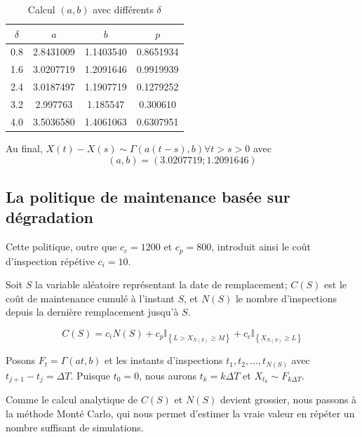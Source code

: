 \documentclass[10pt,a4paper]{article}
\begin{document}
\begin{table}[!h]
    \centering
    \begin{tabular}{|c|c|c|c|}
        \hline
        $\delta$ & $a$ & $b$ & $p$ \\
        \hline
        0.8 & 2.8431009 & 1.1403540 & 0.8651934\\
        1.6 & 3.0207719 & 1.2091646 & 0.9919939\\
        2.4 & 3.0187497 & 1.1907719 & 0.1279252\\
        3.2 & 2.997763 & 1.185547 & 0.300610\\
        4.0 & 3.5036580 & 1.4061063 & 0.6307951\\
        \hline
    \end{tabular}
    \caption{Calcul $(a,b)$ avec différents $\delta$}
\end{table}

Au final, $X(t) - X(s) \sim \Gamma(a(t-s),b) \forall t > s > 0$ avec $$(a,b) = (3.0207719;1.2091646)$$

\subsection{La politique de maintenance basée sur dégradation}

Cette politique, outre que $c_c=1200$ et $c_p=800$, introduit ainsi le coût d'inspection répétive $c_i = 10$.

Soit $S$ la variable aléatoire représentant la date de remplacement; $C(S)$ est le coût de maintenance cumulé à l’instant $S$, et $N(S)$ le nombre d'inspections depuis la dernière remplacement jusqu'à $S$.

\begin{equation}
    \label{c_s_de}
    C\left( S \right) = {c_i}N\left( S \right) + {c_p}{\mathbb{I}_{\left\{ {L > {X_{N\left( S \right)}} \geq M} \right\}}} + {c_c}{\mathbb{I}_{\left\{ {{X_{N\left( S \right)}} \geq L} \right\}}}
\end{equation}

Posons ${F_t} = \Gamma \left( {at,b} \right)$ et les instants d'inspections ${t_1},{t_2},...,{t_{N\left( S \right)}}$ avec ${t_{j + 1}} - {t_j} = \Delta T$. Puisque $t_0 = 0$, nous aurons ${t_k} = k\Delta T$ et $X_{t_k} \sim F_{k\Delta T}$.

Comme le calcul analytique de $C(S)$ et $N(S)$ devient grossier, nous passons à la méthode Monté Carlo, qui nous permet d'estimer la vraie valeur en répéter un nombre suffisant de simulations.
\end{document}
